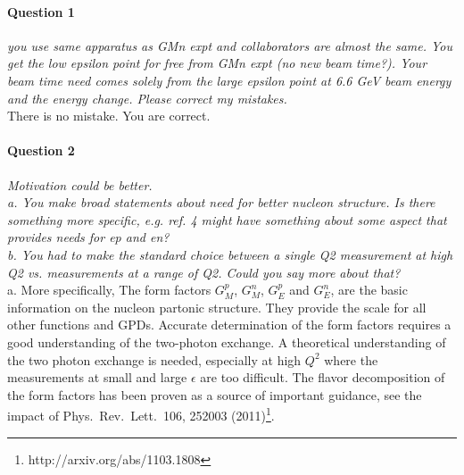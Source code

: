 \documentclass[11pt]{article}
\begin{document}


\paragraph{Question 1}

{\it you use same apparatus as GMn expt and collaborators are almost the same.
  You get the low epsilon point for free from GMn expt (no new beam time?).
  Your beam time need comes solely from the large epsilon point at 6.6 GeV
  beam energy and the energy change.  Please correct my mistakes.}\\

There is no mistake. You are correct.

 
\paragraph{Question 2}

{\it Motivation could be better.}\\
{\it a.  You make broad statements about need for better nucleon structure.
Is there something more specific, e.g. ref. 4 might have something about
some aspect that provides needs for ep and en?}\\
{\it b. You had to make the standard choice between a single Q2
measurement at high Q2 vs. measurements at a range of Q2.  Could you say
more about that?}\\

a. More specifically, The form factors $G_M^p$, $G_M^n$, $G_E^p$ and $G_E^n$, are the basic information on the nucleon partonic structure.
They provide the scale for all other functions and GPDs.
Accurate determination of the form factors requires a good understanding of the two-photon exchange.
A theoretical understanding of the two photon exchange is needed, especially at high $Q^2$ where the measurements at small and large $\epsilon$ are too difficult.
The flavor decomposition of the form factors has been proven as a source of important guidance,
see the impact of Phys.~Rev.~Lett.~106, 252003 (2011)\footnote{http://arxiv.org/abs/1103.1808}.\\
\end{document}
